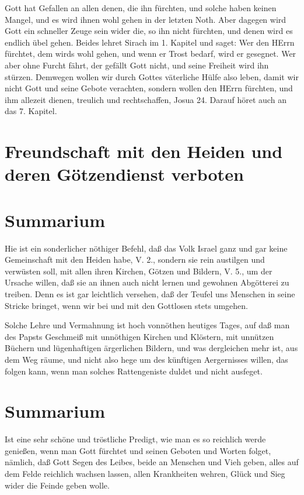 Gott hat Gefallen an allen denen, die ihn fürchten, und solche haben keinen Mangel, und es wird ihnen wohl gehen in der letzten Noth. Aber dagegen wird Gott ein schneller Zeuge sein wider die, so ihn nicht fürchten, und denen wird es endlich übel gehen. Beides lehret Sirach im 1. Kapitel und saget: Wer den HErrn fürchtet, dem wirds wohl gehen, und wenn er Trost bedarf, wird er gesegnet. Wer aber ohne Furcht fährt, der gefällt Gott nicht, und seine Freiheit wird ihn stürzen. Demwegen wollen wir durch Gottes väterliche Hülfe also leben, damit wir nicht Gott und seine Gebote verachten, sondern wollen den HErrn fürchten, und ihm allezeit dienen, treulich und rechtschaffen, Josua 24. Darauf höret auch an das 7. Kapitel.

\section{Freundschaft mit den Heiden und deren Götzendienst verboten}

\section{Summarium}

Hie ist ein sonderlicher nöthiger Befehl, daß das Volk Israel ganz und gar keine Gemeinschaft mit den Heiden habe, V. 2., sondern sie rein austilgen und verwüsten soll, mit allen ihren Kirchen, Götzen und Bildern, V. 5., um der Ursache willen, daß sie an ihnen auch nicht lernen und gewohnen Abgötterei zu treiben. Denn es ist gar leichtlich versehen, daß der Teufel uns Menschen in seine Stricke bringet, wenn wir bei und mit den Gottlosen stets umgehen.

Solche Lehre und Vermahnung ist hoch vonnöthen heutiges Tages, auf daß man des Papsts Geschmeiß mit unnöthigen Kirchen und Klöstern, mit unnützen Büchern und lügenhaftigen ärgerlichen Bildern, und was dergleichen mehr ist, aus dem Weg räume, und nicht also hege um des künftigen Aergernisses willen, das folgen kann, wenn man solches Rattengeniste duldet und nicht ausfeget.

\section{Summarium}

Ist eine sehr schöne und tröstliche Predigt, wie man es so reichlich werde genießen, wenn man Gott fürchtet und seinen Geboten und Worten folget, nämlich, daß Gott Segen des Leibes, beide an Menschen und Vieh geben, alles auf dem Felde reichlich wachsen lassen, allen Krankheiten wehren, Glück und Sieg wider die Feinde geben wolle.


